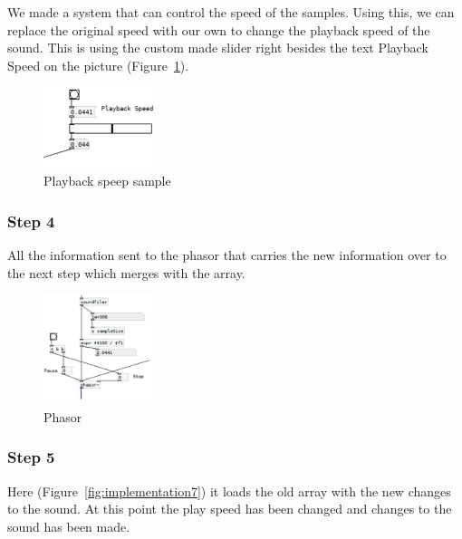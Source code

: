 We made a system that can control the speed of the samples. 
Using this, we can replace the original speed with our own to change the playback speed of the sound. 
This is using the custom made slider right besides the text Playback Speed on the picture (Figure~\ref{fig:implementation5}).

\begin{figure}[!htbp]
    \centering
    \includegraphics[width=0.3\textwidth]{images/Implementation5.png}
    \caption{Playback speep sample}
    \label{fig:implementation5}
\end{figure}


\FloatBarrier
\subsubsection*{Step 4} %
\label{ssub:step_4}

All the information sent to the phasor that carries the new information over to the next step which merges with the array.

\begin{figure}[!htbp]
    \centering
    \includegraphics[width=0.3\textwidth]{images/Implementation6.png}
    \caption{Phasor}
    \label{fig:implementation6}
\end{figure}


\FloatBarrier
\subsubsection*{Step 5} %
\label{ssub:step_5}

Here (Figure~\ref{fig:implementation7}) it loads the old array with the new changes to the sound. 
At this point the play speed has been changed and changes to the sound has been made.

